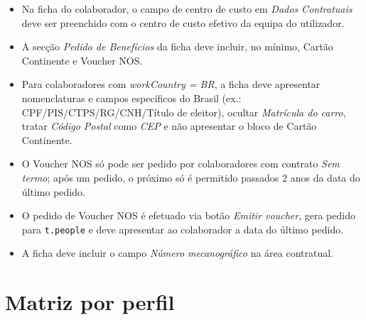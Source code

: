 \documentclass[11pt,a4paper]{article}
\begin{document}
\begin{itemize}
  \item Na ficha do colaborador, o campo de centro de custo em \textit{Dados Contratuais} deve ser preenchido com o centro de custo efetivo da equipa do utilizador.
  \item A secção \textit{Pedido de Benefícios} da ficha deve incluir, no mínimo, Cartão Continente e Voucher NOS.
  \item Para colaboradores com \textit{workCountry = BR}, a ficha deve apresentar nomenclaturas e campos específicos do Brasil (ex.: CPF/PIS/CTPS/RG/CNH/Título de eleitor), ocultar \textit{Matrícula do carro}, tratar \textit{Código Postal} como \textit{CEP} e não apresentar o bloco de Cartão Continente.
  \item O Voucher NOS só pode ser pedido por colaboradores com contrato \textit{Sem termo}; após um pedido, o próximo só é permitido passados 2 anos da data do último pedido.
  \item O pedido de Voucher NOS é efetuado via botão \textit{Emitir voucher}, gera pedido para \texttt{t.people} e deve apresentar ao colaborador a data do último pedido.
  \item A ficha deve incluir o campo \textit{Número mecanográfico} na área contratual.
\end{itemize}

\section{Matriz por perfil}
\end{document}
